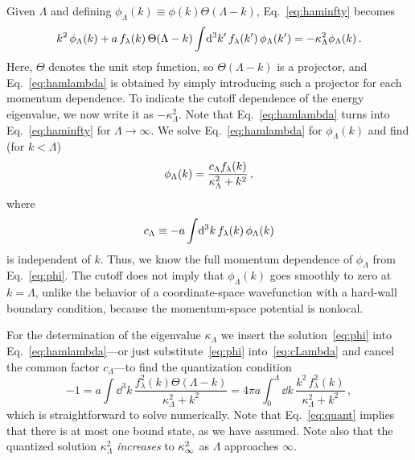 	Given $\Lambda$ and defining $\phi_\Lambda(k) \equiv
	\phi(k)\Theta(\Lambda-k)$, Eq.~\eqref{eq:haminfty} becomes
	\begin{equation}
	 k^2\,\phi_\Lambda(k)
	 + a \,f_{\lambda}(k)\,\Theta(\Lambda-k) \int\!\mathrm{d}^3k'\,
	 f_{\lambda}(k')\,\phi_\Lambda(k')
	 = -\kappa_\Lambda^2 \phi_\Lambda(k) \,.
	\label{eq:hamlambda}
\end{equation}
	Here, $\Theta$ denotes the unit step function, so $\Theta(\Lambda-k)$ is a
	projector, and Eq.~\eqref{eq:hamlambda} is obtained by simply introducing
	such
	a projector for each momentum dependence.  To indicate the cutoff dependence
	of the energy eigenvalue, we now write it as $-\kappa_\Lambda^2$.  Note that
	Eq.~\eqref{eq:hamlambda} turns into Eq.~\eqref{eq:haminfty} for
	$\Lambda\to\infty$.  We solve Eq.~\eqref{eq:hamlambda} for $\phi_\Lambda(k)$
	and find (for $k < \Lambda$)
	\begin{equation}
	\phi_\Lambda(k) = \frac{c_\Lambda f_{\lambda}(k)}{\kappa^2_\Lambda +k^2} \,,
	\label{eq:phi}
	\end{equation}
	where
	\begin{equation}
	c_\Lambda \equiv -a \int\! \mathrm{d}^3k\, f_{\lambda}(k)\,\phi_\Lambda(k)
	\label{eq:cLambda}
	\end{equation}
	is independent of $k$.  Thus, we know the full momentum dependence of
	$\phi_\Lambda$ from Eq.~\eqref{eq:phi}.  The cutoff does not imply
	that $\phi_\Lambda(k)$ goes smoothly to zero at $k=\Lambda$, unlike
	the behavior of a coordinate-space wavefunction with a hard-wall
	boundary condition, because the momentum-space potential is nonlocal.

	For the determination of the eigenvalue $\kappa_\Lambda$ we insert the
	solution~\eqref{eq:phi} into Eq.~\eqref{eq:hamlambda}---or just
	substitute~\eqref{eq:phi} into~\eqref{eq:cLambda} and cancel the common
	factor $c_\Lambda$---to find the quantization condition
	\begin{equation}
	 {-}1 = a \int\! \dd^3k\,
	 \frac{f^2_\lambda(k)\Theta(\Lambda-k)}{\kappa^2_\Lambda+k^2}
	 = 4\pi a \int_0^\Lambda\!\dd k\,
	 \frac{k^2\,f^2_\lambda(k)}{\kappa^2_\Lambda+k^2}
	 \,,
	\label{eq:quant}
	\end{equation}
	which is straightforward to solve numerically.  Note that
	Eq.~\eqref{eq:quant} implies that there is at most one bound state,
	as we have assumed.  Note also that the quantized solution
	$\kappa^2_\Lambda$ \emph{increases} to $\kappa_{\infty}^2$ as $\Lambda$
	approaches $\infty$.

